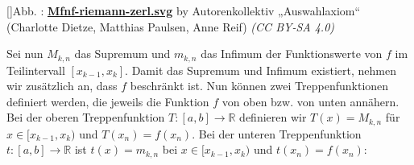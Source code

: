 \documentclass[fontsize=9pt,
               parskip=half-,
               DIV=14,
               listof=chapterentry,
               tocflat]{scrbook}
\newcounter{imagelabel}
\begin{document}
[]{Abb. : \protect\href{https://commons.wikimedia.org/wiki/File:Mfnf-riemann-zerl.svg}{\textbf{Mfnf\allowbreak-riemann\allowbreak-zerl.svg}} by Autorenkollektiv „Auswahlaxiom“ (Charlotte Dietze, Matthias Paulsen, Anne Reif) \textit{(CC BY-SA 4.0)}}\begin{center}
\end{center}

Sei nun $M_{k,n}$ das Supremum und $m_{k,n}$ das Infimum der Funktionswerte von $f$ im Teilintervall $[x_{k-1},x_{k}]$. Damit das Supremum und Infimum existiert, nehmen wir zusätzlich an, dass $f$ beschränkt ist. Nun können zwei Treppenfunktionen definiert werden, die jeweils die Funktion $f$ von oben bzw. von unten annähern. Bei der oberen Treppenfunktion $T:[a,b]\to \mathbb {R} $ definieren wir $T(x)=M_{k,n}$ für $x\in [x_{k-1},x_{k})$ und $T(x_{n})=f(x_{n})$. Bei der unteren Treppenfunktion $t:[a,b]\to \mathbb {R} $ ist $t(x)=m_{k,n}$ bei $x\in [x_{k-1},x_{k})$ und $t(x_{n})=f(x_{n})$:
\end{document}
